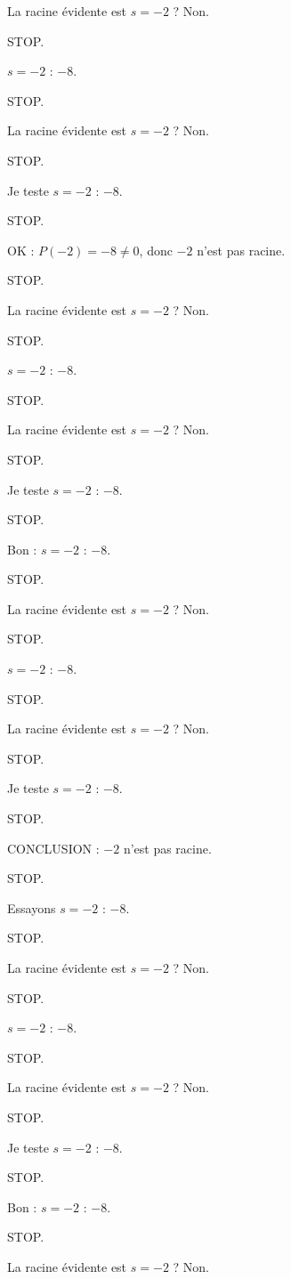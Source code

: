 \documentclass[11pt]{article}
\begin{document}
\begin{exoresolu}
\begin{enumerate}
La racine évidente est $s = -2$ ? Non. 

STOP. 

$s = -2$ : $-8$. 

STOP. 

La racine évidente est $s = -2$ ? Non. 

STOP. 

Je teste $s = -2$ : $-8$. 

STOP. 

OK : $P(-2) = -8 \neq 0$, donc $-2$ n'est pas racine. 

STOP. 

La racine évidente est $s = -2$ ? Non. 

STOP. 

$s = -2$ : $-8$. 

STOP. 

La racine évidente est $s = -2$ ? Non. 

STOP. 

Je teste $s = -2$ : $-8$. 

STOP. 

Bon : $s = -2$ : $-8$. 

STOP. 

La racine évidente est $s = -2$ ? Non. 

STOP. 

$s = -2$ : $-8$. 

STOP. 

La racine évidente est $s = -2$ ? Non. 

STOP. 

Je teste $s = -2$ : $-8$. 

STOP. 

CONCLUSION : $-2$ n'est pas racine. 

STOP. 

Essayons $s = -2$ : $-8$. 

STOP. 

La racine évidente est $s = -2$ ? Non. 

STOP. 

$s = -2$ : $-8$. 

STOP. 

La racine évidente est $s = -2$ ? Non. 

STOP. 

Je teste $s = -2$ : $-8$. 

STOP. 

Bon : $s = -2$ : $-8$. 

STOP. 

La racine évidente est $s = -2$ ? Non. 


\end{enumerate}
\end{exoresolu}
\end{document}
